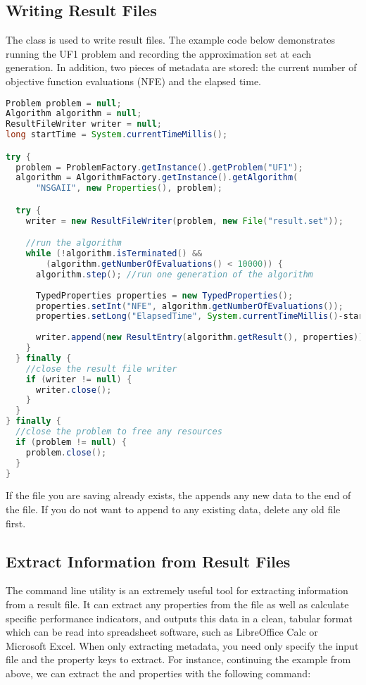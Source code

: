 \subsection{Writing Result Files}

The  class is used to write result files.  The example code below demonstrates running the UF1 problem and recording the approximation set at each generation.  In addition, two pieces of metadata are stored: the current number of objective function evaluations (NFE) and the elapsed time.

\begin{lstlisting}[language=Java]
Problem problem = null;
Algorithm algorithm = null;
ResultFileWriter writer = null;
long startTime = System.currentTimeMillis();

try {
  problem = ProblemFactory.getInstance().getProblem("UF1");  
  algorithm = AlgorithmFactory.getInstance().getAlgorithm(
      "NSGAII", new Properties(), problem);

  try {
    writer = new ResultFileWriter(problem, new File("result.set"));

    //run the algorithm
    while (!algorithm.isTerminated() && 
        (algorithm.getNumberOfEvaluations() < 10000)) {
      algorithm.step(); //run one generation of the algorithm
    
      TypedProperties properties = new TypedProperties();
      properties.setInt("NFE", algorithm.getNumberOfEvaluations());
      properties.setLong("ElapsedTime", System.currentTimeMillis()-start);
      
      writer.append(new ResultEntry(algorithm.getResult(), properties));
    }
  } finally {
    //close the result file writer
    if (writer != null) {
      writer.close();
    }
  }
} finally {
  //close the problem to free any resources
  if (problem != null) {
    problem.close(); 
  }
}
\end{lstlisting}

\begin{important}
If the file you are saving already exists, the  appends any new data to the end of the file.  If you do not want to append to any existing data, delete any old file first.
\end{important}

\subsection{Extract Information from Result Files}
The  command line utility is an extremely useful tool for extracting information from a result file.  It can extract any properties from the file as well as calculate specific performance indicators, and outputs this data in a clean, tabular format which can be read into spreadsheet software, such as LibreOffice Calc or Microsoft Excel.  When only extracting metadata, you need only specify the input file and the property keys to extract.  For instance, continuing the example from above, we can extract the  and  properties with the following command:

